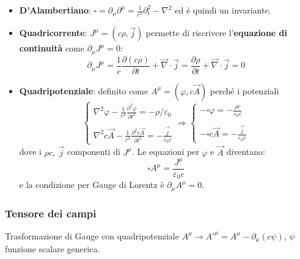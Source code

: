 \documentclass[a4paper]{scrartcl}
\numberwithin{equation}{subsection}
\theoremstyle{style1}
\begin{document}
\begin{itemize}
\`e un invariante (scalare). Per trasformazione, si usa $\frac{\partial x^\nu}{\partial x'^\mu } = \Lambda\indices{_\mu ^\nu}$.
\item \textbf{D'Alambertiano}: $\square = \partial _\mu \partial ^\mu = \frac{1}{c^2}\partial _t^2 - \nabla ^2$ ed \`e quindi un invariante.
\item \textbf{Quadricorrente}: $J^\mu = (c\rho , \vec{j})$ permette di riscrivere l'\textbf{equazione di continuit\`a} come $\partial _\mu  J^\mu  =0$:
	\begin{equation}
		\partial _\mu J^\mu  = \frac{1}{c}\frac{\partial (c\rho )}{\partial t} + \vec{\nabla }\cdot \vec{j}= \frac{\partial \rho }{\partial t} + \vec{\nabla }\cdot \vec{j}=0
	\end{equation}
\item \textbf{Quadripotenziale}: definito come $A^\mu =(\varphi ,c \vec{A})$ perch\'e i potenziali
	\begin{equation*}
		\begin{cases}
			\displaystyle \nabla ^2 \varphi  - \frac{1}{c^2}\frac{\partial ^2 \varphi }{\partial t^2} = - \rho /\varepsilon _0 \\
			\\
			\displaystyle \nabla^2 c \vec{A} - \frac{1}{c^2}\frac{\partial ^2 c \vec{A}}{\partial t^2} = - \frac{\vec{j}}{\varepsilon _0 c} 
		\end{cases}\Rightarrow  \begin{cases}
			\displaystyle - \square \varphi  = -\frac{\rho c}{\varepsilon _0 c}\\
			\\
			\displaystyle - \square c \vec{A} = - \frac{\vec{j}}{\varepsilon _0 c}
		\end{cases}
	\end{equation*}
	dove i $\rho  c, \ \vec{j}$ componenti di $J^\mu $. Le equazioni per $\varphi $ e $\vec{A}$ diventano:
	\begin{equation}
		\square A^\mu  = \frac{J^\mu }{\varepsilon _0 c}
	\end{equation}
	e la condizione per Gauge di Lorentz \`e $\partial _\mu A^\mu  = 0$.
\end{itemize}
\subsubsection{Tensore dei campi}

Trasformazione di Gauge con quadripotenziale $A^\mu \to A'^\mu = A^\mu  - \partial _\mu (c\psi )$, $\psi $ funzione scalare generica. 
\end{document}
